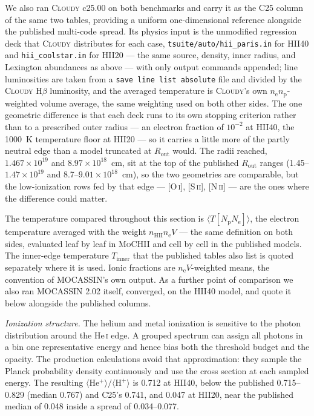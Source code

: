 \documentclass[twocolumn,linenumbers]{aastex702}
\newcommand{\code}[1]{\texttt{#1}}
\newcommand{\MoCHII}{\textsc{MoCHII}}
\newcommand{\HeI}{He\,\textsc{i}}
\newcommand{\nelec}{n_{\mathrm{e}}}
\begin{document}
We also ran \textsc{Cloudy} c25.00 \citep{cloudy2025} on both benchmarks and
carry it as the C25 column of the same two tables, providing a uniform
one-dimensional reference alongside the published multi-code spread.  Its
physics input is the
unmodified regression deck that \textsc{Cloudy} distributes for each case,
\code{tsuite/auto/hii\_paris.in} for HII40 and \code{hii\_coolstar.in} for
HII20 --- the same source, density, inner radius, and Lexington abundances as
above --- with only output commands appended; line luminosities are taken
from a \code{save line list absolute} file and divided by the \textsc{Cloudy}
H$\beta$ luminosity, and the averaged temperature is \textsc{Cloudy}'s own
$n_{\mathrm{e}}n_{\mathrm{p}}$-weighted volume average, the same weighting
used on both other sides.  The one geometric difference is that each deck
runs to its own stopping criterion rather than to a prescribed outer radius
--- an electron fraction of $10^{-2}$ at HII40, the 1000~K temperature floor
at HII20 --- so it carries a little more of the partly neutral edge than a
model truncated at $R_{\mathrm{out}}$ would.  The radii reached,
$1.467\times10^{19}$ and $8.97\times10^{18}$~cm, sit at the top of the
published $R_{\mathrm{out}}$ ranges (1.45--$1.47\times10^{19}$ and
8.7--$9.01\times10^{18}$~cm), so the two geometries are comparable, but the
low-ionization rows fed by that edge --- [O\,\textsc{i}], [S\,\textsc{ii}],
[N\,\textsc{ii}] --- are the ones where the difference could matter.

The temperature compared throughout this section is
$\langle T[N_{\mathrm{p}}N_{\mathrm{e}}]\rangle$, the electron temperature
averaged with the weight $n_{\mathrm{HII}}\nelec V$ --- the same definition
on both sides, evaluated leaf by leaf in \MoCHII{} and cell by cell in the
published models.  The inner-edge temperature $T_{\mathrm{inner}}$ that the
published tables also list is quoted separately where it is used.  Ionic
fractions are $\nelec V$-weighted means, the convention of MOCASSIN's own
output.  As a further point of comparison we also ran MOCASSIN 2.02 itself,
converged, on the HII40 model, and quote it below alongside the published
columns.

\emph{Ionization structure.}  The helium and metal ionization is sensitive
to the photon distribution around the \HeI{} edge.  A grouped spectrum can
assign all photons in a bin one representative energy and hence bias both
the threshold budget and the opacity.  The production calculations avoid
that approximation: they sample the Planck probability density continuously
and use the cross section at each sampled energy.  The resulting
$\langle\mathrm{He^{+}}\rangle/\langle\mathrm{H^{+}}\rangle$ is 0.712 at
HII40, below the published 0.715--0.829 (median 0.767) and C25's 0.741, and
0.047 at HII20, near the published median of 0.048 inside a spread of
0.034--0.077.
\end{document}
